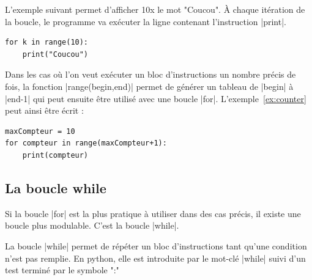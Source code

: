 \documentclass[11pt, a4paper]{book}
\begin{document}
\begin{example}
L'exemple suivant permet d'afficher 10x le mot "Coucou". À chaque itération de la boucle, le programme va exécuter la ligne contenant l'instruction |print|.
\end{example}

\begin{lstlisting}
for k in range(10):
    print("Coucou")
\end{lstlisting}


\begin{remarque}
Dans les cas où l'on veut exécuter un bloc d'instructions un nombre précis de fois, la fonction |range(begin,end)| permet de générer un tableau de |begin| à |end-1| qui peut ensuite être utilisé avec une boucle |for|. L'exemple~\ref{ex:counter} peut ainsi être écrit : 

\end{remarque}

\begin{lstlisting}
maxCompteur = 10
for compteur in range(maxCompteur+1):
    print(compteur)
\end{lstlisting}


\subsection{La boucle \textsf{while}}
Si la boucle |for| est la plus pratique à utiliser dans des cas précis, il existe une boucle plus modulable. C'est la boucle |while|.

\begin{defi} La boucle |while| permet de répéter un bloc d'instructions tant qu'une condition n'est pas remplie. En python, elle est introduite par le mot-clé |while| suivi d'un test terminé par le symbole ":" 
\end{defi}
\end{document}
